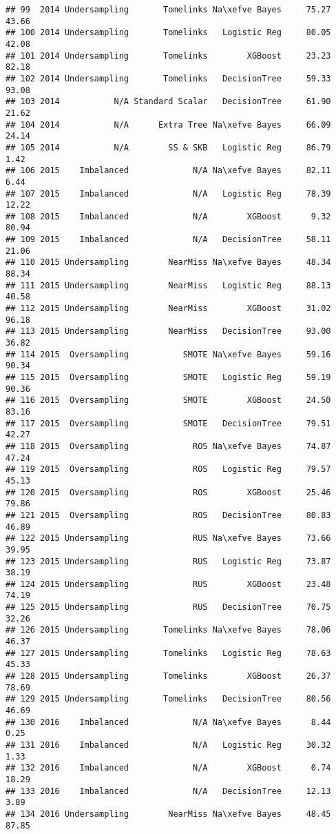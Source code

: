 \documentclass[
]{article}
\begin{document}
\begin{verbatim}
## 99  2014 Undersampling       Tomelinks Na\xefve Bayes     75.27  43.66
## 100 2014 Undersampling       Tomelinks   Logistic Reg     80.05  42.08
## 101 2014 Undersampling       Tomelinks        XGBoost     23.23  82.18
## 102 2014 Undersampling       Tomelinks   DecisionTree     59.33  93.08
## 103 2014           N/A Standard Scalar   DecisionTree     61.90  21.62
## 104 2014           N/A      Extra Tree Na\xefve Bayes     66.09  24.14
## 105 2014           N/A        SS & SKB   Logistic Reg     86.79   1.42
## 106 2015    Imbalanced             N/A Na\xefve Bayes     82.11   6.44
## 107 2015    Imbalanced             N/A   Logistic Reg     78.39  12.22
## 108 2015    Imbalanced             N/A        XGBoost      9.32  80.94
## 109 2015    Imbalanced             N/A   DecisionTree     58.11  21.06
## 110 2015 Undersampling        NearMiss Na\xefve Bayes     48.34  88.34
## 111 2015 Undersampling        NearMiss   Logistic Reg     88.13  40.58
## 112 2015 Undersampling        NearMiss        XGBoost     31.02  96.18
## 113 2015 Undersampling        NearMiss   DecisionTree     93.00  36.82
## 114 2015  Oversampling           SMOTE Na\xefve Bayes     59.16  90.34
## 115 2015  Oversampling           SMOTE   Logistic Reg     59.19  90.36
## 116 2015  Oversampling           SMOTE        XGBoost     24.50  83.16
## 117 2015  Oversampling           SMOTE   DecisionTree     79.51  42.27
## 118 2015  Oversampling             ROS Na\xefve Bayes     74.87  47.24
## 119 2015  Oversampling             ROS   Logistic Reg     79.57  45.13
## 120 2015  Oversampling             ROS        XGBoost     25.46  79.86
## 121 2015  Oversampling             ROS   DecisionTree     80.83  46.89
## 122 2015 Undersampling             RUS Na\xefve Bayes     73.66  39.95
## 123 2015 Undersampling             RUS   Logistic Reg     73.87  38.19
## 124 2015 Undersampling             RUS        XGBoost     23.48  74.19
## 125 2015 Undersampling             RUS   DecisionTree     70.75  32.26
## 126 2015 Undersampling       Tomelinks Na\xefve Bayes     78.06  46.37
## 127 2015 Undersampling       Tomelinks   Logistic Reg     78.63  45.33
## 128 2015 Undersampling       Tomelinks        XGBoost     26.37  78.69
## 129 2015 Undersampling       Tomelinks   DecisionTree     80.56  46.69
## 130 2016    Imbalanced             N/A Na\xefve Bayes      8.44   0.25
## 131 2016    Imbalanced             N/A   Logistic Reg     30.32   1.33
## 132 2016    Imbalanced             N/A        XGBoost      0.74  18.29
## 133 2016    Imbalanced             N/A   DecisionTree     12.13   3.89
## 134 2016 Undersampling        NearMiss Na\xefve Bayes     48.45  87.85

\end{verbatim}
\end{document}

